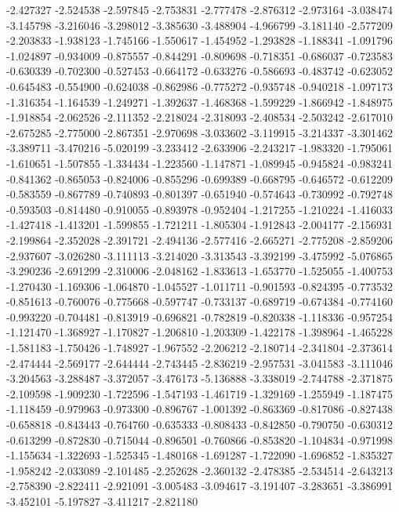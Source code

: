 -2.427327
-2.524538
-2.597845
-2.753831
-2.777478
-2.876312
-2.973164
-3.038474
-3.145798
-3.216046
-3.298012
-3.385630
-3.488904
-4.966799
-3.181140
-2.577209
-2.203833
-1.938123
-1.745166
-1.550617
-1.454952
-1.293828
-1.188341
-1.091796
-1.024897
-0.934009
-0.875557
-0.844291
-0.809698
-0.718351
-0.686037
-0.723583
-0.630339
-0.702300
-0.527453
-0.664172
-0.633276
-0.586693
-0.483742
-0.623052
-0.645483
-0.554900
-0.624038
-0.862986
-0.775272
-0.935748
-0.940218
-1.097173
-1.316354
-1.164539
-1.249271
-1.392637
-1.468368
-1.599229
-1.866942
-1.848975
-1.918854
-2.062526
-2.111352
-2.218024
-2.318093
-2.408534
-2.503242
-2.617010
-2.675285
-2.775000
-2.867351
-2.970698
-3.033602
-3.119915
-3.214337
-3.301462
-3.389711
-3.470216
-5.020199
-3.233412
-2.633906
-2.243217
-1.983320
-1.795061
-1.610651
-1.507855
-1.334434
-1.223560
-1.147871
-1.089945
-0.945824
-0.983241
-0.841362
-0.865053
-0.824006
-0.855296
-0.699389
-0.668795
-0.646572
-0.612209
-0.583559
-0.867789
-0.740893
-0.801397
-0.651940
-0.574643
-0.730992
-0.792748
-0.593503
-0.814480
-0.910055
-0.893978
-0.952404
-1.217255
-1.210224
-1.416033
-1.427418
-1.413201
-1.599855
-1.721211
-1.805304
-1.912843
-2.004177
-2.156931
-2.199864
-2.352028
-2.391721
-2.494136
-2.577416
-2.665271
-2.775208
-2.859206
-2.937607
-3.026280
-3.111113
-3.214020
-3.313543
-3.392199
-3.475992
-5.076865
-3.290236
-2.691299
-2.310006
-2.048162
-1.833613
-1.653770
-1.525055
-1.400753
-1.270430
-1.169306
-1.064870
-1.045527
-1.011711
-0.901593
-0.824395
-0.773532
-0.851613
-0.760076
-0.775668
-0.597747
-0.733137
-0.689719
-0.674384
-0.774160
-0.993220
-0.704481
-0.813919
-0.696821
-0.782819
-0.820338
-1.118336
-0.957254
-1.121470
-1.368927
-1.170827
-1.206810
-1.203309
-1.422178
-1.398964
-1.465228
-1.581183
-1.750426
-1.748927
-1.967552
-2.206212
-2.180714
-2.341804
-2.373614
-2.474444
-2.569177
-2.644444
-2.743445
-2.836219
-2.957531
-3.041583
-3.111046
-3.204563
-3.288487
-3.372057
-3.476173
-5.136888
-3.338019
-2.744788
-2.371875
-2.109598
-1.909230
-1.722596
-1.547193
-1.461719
-1.329169
-1.255949
-1.187475
-1.118459
-0.979963
-0.973300
-0.896767
-1.001392
-0.863369
-0.817086
-0.827438
-0.658818
-0.843443
-0.764760
-0.635333
-0.808433
-0.842850
-0.790750
-0.630312
-0.613299
-0.872830
-0.715044
-0.896501
-0.760866
-0.853820
-1.104834
-0.971998
-1.155634
-1.322693
-1.525345
-1.480168
-1.691287
-1.722090
-1.696852
-1.835327
-1.958242
-2.033089
-2.101485
-2.252628
-2.360132
-2.478385
-2.534514
-2.643213
-2.758390
-2.822411
-2.921091
-3.005483
-3.094617
-3.191407
-3.283651
-3.386991
-3.452101
-5.197827
-3.411217
-2.821180
